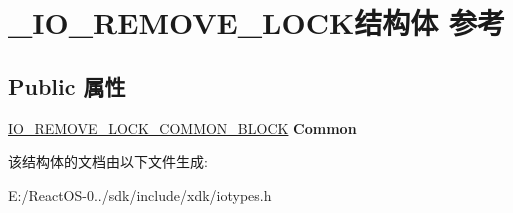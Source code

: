 \hypertarget{struct___i_o___r_e_m_o_v_e___l_o_c_k}{}\section{\+\_\+\+I\+O\+\_\+\+R\+E\+M\+O\+V\+E\+\_\+\+L\+O\+C\+K结构体 参考}
\label{struct___i_o___r_e_m_o_v_e___l_o_c_k}
\subsection*{Public 属性}
\begin{DoxyCompactItemize}
\item 
\mbox{\label{struct___i_o___r_e_m_o_v_e___l_o_c_k_ae34227a85b13b14731db23a21a59900d}} 
\hyperlink{struct___i_o___r_e_m_o_v_e___l_o_c_k___c_o_m_m_o_n___b_l_o_c_k}{I\+O\+\_\+\+R\+E\+M\+O\+V\+E\+\_\+\+L\+O\+C\+K\+\_\+\+C\+O\+M\+M\+O\+N\+\_\+\+B\+L\+O\+CK} {\bfseries Common}
\end{DoxyCompactItemize}


该结构体的文档由以下文件生成\+:\begin{DoxyCompactItemize}
\item 
E\+:/\+React\+O\+S-\/0../sdk/include/xdk/iotypes.\+h\end{DoxyCompactItemize}
